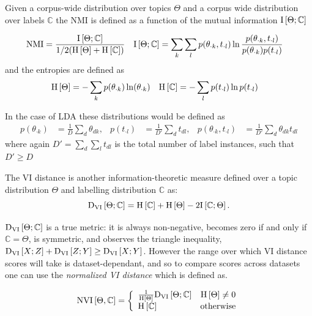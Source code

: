 \newcommand{\TopDist}{\Theta}
\newcommand{\LabDist}{\mathbb{C}}
\newcommand{\NMI}{\text{NMI}}

Given a corpus-wide distribution over topics $\TopDist$ and a corpus wide distribution over labels $\LabDist$ the NMI is defined as a function of the mutual information $\mut{\TopDist}{\LabDist}$

\begin{align}
\NMI & = \frac{\mut{\TopDist}{\LabDist}}{1/2(\ent{\TopDist} + \ent{\LabDist})} &
\mut{\TopDist}{\LabDist} & = \sum_k \sum_l p(\theta_{\cdot k}, t_{\cdot l}) \ln \frac{p(\theta_{\cdot k}, t_{\cdot l})}{p(\theta_{\cdot k})p(t_{\cdot l})}
\end{align}
and the entropies are defined as
\begin{align}
\ent{\TopDist} & = - \sum_k p(\theta_{\cdot k}) \ln (\theta_{\cdot k}) &
\ent{\LabDist} & = - \sum_l p(t_{\cdot l}) \ln p(t_{\cdot l})
\end{align}

In the case of LDA these distributions would be defined as
\begin{align}
p(\theta_{\cdot k}) & =  \frac{1}{D} \sum_d \theta_{dk} ,&
p(t_{\cdot l}) &= \frac{1}{D'} \sum_d t_{dl} ,& 
p(\theta_{\cdot k}, t_{\cdot l}) & = \frac{1}{D'} \sum_d \theta_{dk} t_{dl}
\end{align}
where again $D' = \sum_d \sum_l t_{dl}$ is the total number of label instances, such that $D' \geq D$


The VI distance\cite{Meila2003} is another information-theoretic measure defined over a topic distribution $\TopDist$ and labelling distribution $\LabDist$ as:
\begin{equation}
\dvi{\TopDist}{\LabDist} = \ent{\LabDist} + \ent{\TopDist} - 2 \mut{\LabDist}{\TopDist}.
\end{equation}

$\dvi{\TopDist}{\LabDist}$ is a true metric: it is always non-negative, becomes zero if and only if $\LabDist = \TopDist$, is symmetric, and observes the triangle inequality, $\text{D}_\text{VI} \left[ X; Z \right] + \text{D}_\text{VI} \left[ Z; Y \right] \geq \text{D}_\text{VI} \left[ X; Y \right]$. However the range over which VI distance scores will take is dataset-dependant, and so to compare scores across datasets one can use the \emph{normalized VI distance}\cite{Reichart2009} which is defined as. 

\begin{align}
\text{NVI}\left[ \TopDist, \LabDist \right] = \left\{ \begin{array}{lr}
     \frac{1}{\ent{\TopDist}}\dvi{\TopDist}{\LabDist} & \ent{\TopDist} \neq 0 \\
     \ent{\LabDist} & \text{otherwise}
 \end{array}\right.
\end{align}


